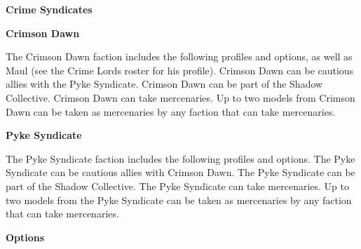 \documentclass{article}
\begin{document}
{\Huge \textbf{Crime Syndicates}}
\vspace{0.6cm}

{\Large \textbf{Crimson Dawn}}
\vspace{0.3cm}

\begin{minipage}{19cm}
    The Crimson Dawn faction includes the following profiles and options, as well
    as Maul (see the Crime Lords roster for his profile). Crimson Dawn can be cautious
    allies with the Pyke Syndicate. Crimson Dawn can be part of the Shadow Collective.
    Crimson Dawn can take mercenaries.
    Up to two models from Crimson Dawn can be taken as mercenaries
    by any faction that can take mercenaries.
\end{minipage}

\vspace{0.3cm}
{\scriptsize
\setlength\extrarowheight{1.5pt}

}
\vspace{0.6cm}

{\Large \textbf{Pyke Syndicate}}
\vspace{0.3cm}

\begin{minipage}{19cm}
    The Pyke Syndicate faction includes the following profiles and options.
    The Pyke Syndicate can be cautious allies with Crimson Dawn.
    The Pyke Syndicate can be part of the Shadow Collective.
    The Pyke Syndicate can take mercenaries.
    Up to two models from the Pyke Syndicate can be taken as mercenaries
    by any faction that can take mercenaries.
\end{minipage}

\vspace{0.3cm}
{\scriptsize
\setlength\extrarowheight{1.5pt}

}
\vspace{0.6cm}

{\large \textbf{Options}}
\vspace{0.3cm}
\begin{multicols}{2}
    {\scriptsize

    \setlength\extrarowheight{1.5pt}
    

    \vspace{0.6cm}

    \setlength\extrarowheight{1.5pt}
    

    }
\end{multicols}
\end{document}
